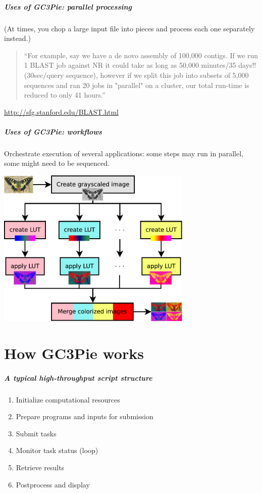 \documentclass[english,serif,mathserif,xcolor=pdftex,dvipsnames,table]{beamer}
\begin{document}
\begin{frame}[fragile]
  \frametitle{Uses of GC3Pie: parallel processing}
  (At times, you chop a large input file into pieces and process each one separately instead.)

  \+
  \begin{quote}
    ``For example, say we have a de novo assembly of 100,000
    contigs. If we run 1 BLAST job against NR it could take as long as
    50,000 minutes/35 days!! (30sec/query sequence), however if we
    split this job into subsets of 5,000 sequences and ran 20 jobs in
    "parallel" on a cluster, our total run-time is reduced to only 41
    hours.''
  \end{quote}
  \begin{references}
    \url{http://sfg.stanford.edu/BLAST.html}
  \end{references}
\end{frame}


\begin{frame}
  \frametitle{Uses of GC3Pie: workflows}

  \begin{center}
    Orchestrate execution of several applications:
    some steps may run in parallel, some might need to be sequenced.

    \+
    \includegraphics[width=0.70\textwidth]{fig/warholize-wkf-with-results.pdf}
  \end{center}
\end{frame}


\part{How GC3Pie works}

\begin{frame}
  \frametitle{A typical high-throughput script structure}

  \begin{enumerate}
  \item Initialize computational resources
  \item Prepare programs and inputs for submission
  \item Submit tasks
  \item Monitor task status (loop)
  \item Retrieve results
  \item Postprocess and display
  \end{enumerate}
\end{frame}
\end{document}
